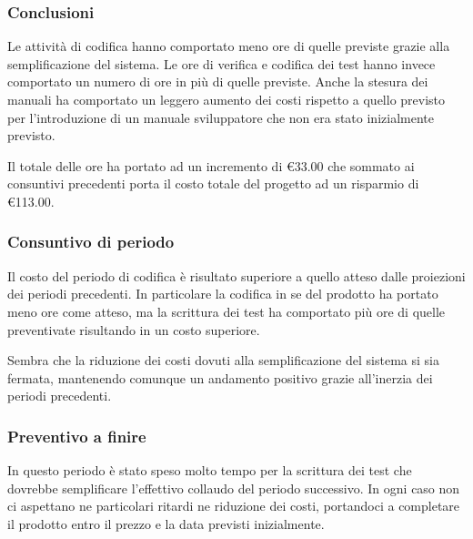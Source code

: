\documentclass[12pt,a4paper]{article}
\begin{document}
\subsubsection{Conclusioni}

\par Le attività di codifica hanno comportato meno ore di quelle previste grazie alla semplificazione del sistema. Le ore di verifica e codifica dei test hanno invece comportato un numero di ore in più di quelle previste. Anche la stesura dei manuali ha comportato un leggero aumento dei costi rispetto a quello previsto per l'introduzione di un manuale sviluppatore che non era stato inizialmente previsto. \\

\par Il totale delle ore ha portato ad un incremento di \euro{}33.00 che sommato ai consuntivi precedenti porta il costo totale del progetto ad un risparmio di \euro{}113.00. \\

\subsubsection{Consuntivo di periodo}

\par Il costo del periodo di codifica è risultato superiore a quello atteso dalle proiezioni dei periodi precedenti. In particolare la codifica in se del prodotto ha portato meno ore come atteso, ma la scrittura dei test ha comportato più ore di quelle preventivate risultando in un costo superiore. \\

\par Sembra che la riduzione dei costi dovuti alla semplificazione del sistema si sia fermata, mantenendo comunque un andamento positivo grazie all'inerzia dei periodi precedenti. \\

\subsubsection{Preventivo a finire}

\par In questo periodo è stato speso molto tempo per la scrittura dei test che dovrebbe semplificare l'effettivo collaudo del periodo successivo. In ogni caso non ci aspettano ne particolari ritardi ne riduzione dei costi, portandoci a completare il prodotto entro il prezzo e la data previsti inizialmente. \\
\end{document}

